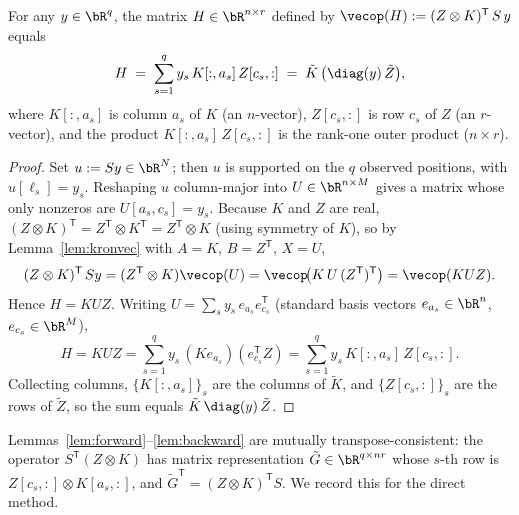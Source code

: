\begin{lemma}\label{lem:backward}
For any $y\in\bR^q$, the matrix $H\in\bR^{n\times r}$ defined by
$\vecop(H):=(Z\otimes K)^{\mathsf T}\,S\,y$ equals
\begin{equation}\label{eq:backward}
  H \;=\; \sum_{s=1}^{q} y_s\,K[:,a_s]\,Z[c_s,:]
       \;=\; \tilde K\,\big(\diag(y)\,\tilde Z\big),
\end{equation}
where $K[:,a_s]$ is column $a_s$ of $K$ (an $n$-vector), $Z[c_s,:]$ is row $c_s$ of $Z$
(an $r$-vector), and the product $K[:,a_s]\,Z[c_s,:]$ is the rank-one outer product
($n\times r$).
\end{lemma}
\begin{proof}
Set $u:=Sy\in\bR^N$; then $u$ is supported on the $q$ observed positions, with
$u[\ell_s]=y_s$. Reshaping $u$ column-major into $U\in\bR^{n\times M}$ gives a matrix
whose only nonzeros are $U[a_s,c_s]=y_s$. Because $K$ and $Z$ are real,
$(Z\otimes K)^{\mathsf T}=Z^{\mathsf T}\otimes K^{\mathsf T}=Z^{\mathsf T}\otimes K$
(using symmetry of $K$), so by Lemma~\ref{lem:kronvec} with $A=K$, $B=Z^{\mathsf T}$,
$X=U$,
\[
  (Z\otimes K)^{\mathsf T}\,Sy
  =(Z^{\mathsf T}\otimes K)\vecop(U)
  =\vecop\!\big(K\,U\,(Z^{\mathsf T})^{\mathsf T}\big)
  =\vecop(KUZ).
\]
Hence $H=KUZ$. Writing $U=\sum_{s}y_s\,e_{a_s}e_{c_s}^{\mathsf T}$
(standard basis vectors $e_{a_s}\in\bR^n$, $e_{c_s}\in\bR^M$),
\[
  H=KUZ=\sum_{s=1}^{q}y_s\,(Ke_{a_s})(e_{c_s}^{\mathsf T}Z)
   =\sum_{s=1}^{q}y_s\,K[:,a_s]\,Z[c_s,:].
\]
Collecting columns, $\{K[:,a_s]\}_s$ are the columns of $\tilde K$, and
$\{Z[c_s,:]\}_s$ are the rows of $\tilde Z$, so the sum equals
$\tilde K\,\diag(y)\,\tilde Z$.
\end{proof}

Lemmas~\ref{lem:forward}--\ref{lem:backward} are mutually transpose-consistent: the
operator $S^{\mathsf T}(Z\otimes K)$ has matrix representation
$\tilde G\in\bR^{q\times nr}$ whose $s$-th row is
$Z[c_s,:]\otimes K[a_s,:]$, and $\tilde G^{\mathsf T}=(Z\otimes K)^{\mathsf T}S$. We
record this for the direct method.

